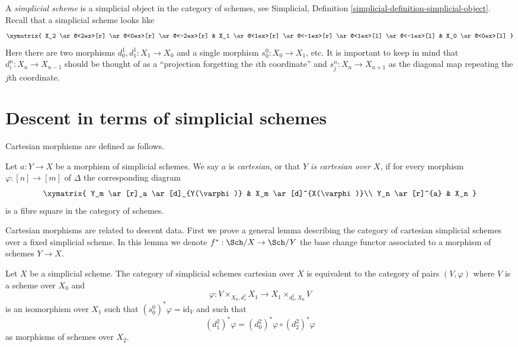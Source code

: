 \noindent
A {\it simplicial scheme} is a simplicial object in the category of schemes,
see Simplicial, Definition \ref{simplicial-definition-simplicial-object}.
Recall that a simplicial scheme looks like
$$
\xymatrix{
X_2
\ar@<2ex>[r]
\ar@<0ex>[r]
\ar@<-2ex>[r]
&
X_1
\ar@<1ex>[r]
\ar@<-1ex>[r]
\ar@<1ex>[l]
\ar@<-1ex>[l]
&
X_0
\ar@<0ex>[l]
}
$$
Here there are two morphisms $d^1_0, d^1_1 : X_1 \to X_0$
and a single morphism $s^0_0 : X_0 \to X_1$, etc.
It is important to keep in mind that $d^n_i : X_n \to X_{n - 1}$
should be thought of as a ``projection forgetting the
$i$th coordinate'' and $s^n_j : X_n \to X_{n + 1}$ as the diagonal
map repeating the $j$th coordinate.





\section{Descent in terms of simplicial schemes}
\label{section-simplicial-descent}

\noindent
Cartesian morphisms are defined as follows.

\begin{definition}
\label{definition-cartesian-morphism}
Let $a : Y \to X$ be a morphism of simplicial schemes.
We say $a$ is {\it cartesian}, or that {\it $Y$ is cartesian over $X$},
if for every morphism $\varphi : [n] \to [m]$ of $\Delta$ the corresponding
diagram
$$
\xymatrix{
Y_m \ar[r]_a \ar[d]_{Y(\varphi)} & X_m \ar[d]^{X(\varphi)}\\
Y_n \ar[r]^{a} & X_n
}
$$
is a fibre square in the category of schemes.
\end{definition}

\noindent
Cartesian morphisms are related to descent data. First we prove a general
lemma describing the category of cartesian simplicial schemes over a
fixed simplicial scheme. In this lemma we denote $f^* : \Sch/X \to \Sch/Y$
the base change functor associated to a morphism of schemes $Y \to X$.

\begin{lemma}
\label{lemma-characterize-cartesian-schemes}
Let $X$ be a simplicial scheme. The category of simplicial schemes cartesian
over $X$ is equivalent to the category of pairs $(V, \varphi)$
where $V$ is a scheme over $X_0$ and
$$
\varphi :
V \times_{X_0, d^1_1} X_1
\longrightarrow
X_1 \times_{d^1_0, X_0} V
$$
is an isomorphism over $X_1$ such that
$(s_0^0)^*\varphi = \text{id}_V$ and such that
$$
(d^2_1)^*\varphi = (d^2_0)^*\varphi \circ (d^2_2)^*\varphi
$$
as morphisms of schemes over $X_2$.
\end{lemma}

